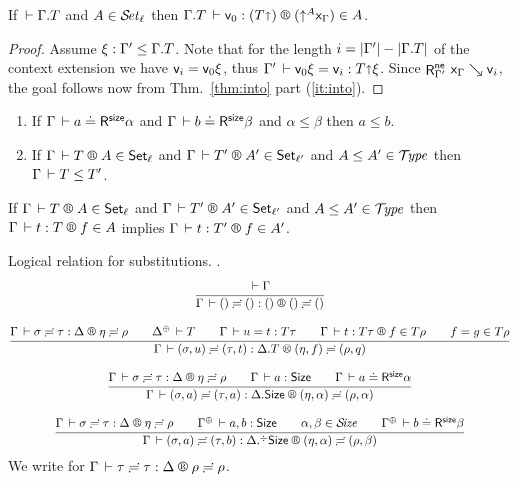 \documentclass[acmlarge,review,anonymous]{acmart}\settopmatter{printfolios=true}
\begin{document}
\begin{corollary}
  \label{cor:fresh}
  If $\der \cext \Gamma T$ and $A \in \SET[\ell]$
  then $\LR {\cext \Gamma T} {\ind 0} {(T \slift)} {(\up A \var\Gamma)} A$.
\end{corollary}
\begin{proof}
  Assume $\xi : \Gamma' \leq \cext \Gamma T$.
  Note that for the length
  $i = |\Gamma'| - |\cext \Gamma T|$ of the context extension
  we have $\ind i = \ind 0 \xi$, thus
  $\Gamma' \der \ind 0 \xi = \ind i : T \slift \xi$.
  Since $\RNe{\Gamma'} {\var\Gamma} {\ind i}$,
  the goal follows now from Thm.~\ref{thm:into} part (\ref{it:into}).
\end{proof}


\begin{lemma}
\label{lem:lrsub}
\bla
\begin{enumerate}
\item
   If $\LRSize \Gamma a \alpha$ and $\LRSize \Gamma {b} \beta$ and $\alpha \leq \beta$ then $a \leq b$.
\item
   If $\LRT \Gamma T A \ell$ and $\LRT \Gamma {T'} {A'} {\ell'}$ and $A \leq A' \in \TYPE$ then $\Gamma \der T \leq T'$.
\end{enumerate}
\end{lemma}


\begin{lemma}
\label{lem:lrsump}
   If $\LRT \Gamma T A \ell$ and $\LRT \Gamma {T'} {A'} {\ell'}$ and $A \leq A' \in \TYPE$ then
   $\LR \Gamma t T f A$ implies $\LR \Gamma t {T'} f {A'}$.
\end{lemma}


Logical relation for substitutions.
\fbox{$\LRSub \Gamma \sigma \tau \Delta \eta \rho$}.
\begin{gather*}
  \ru{\der \Gamma
    }{\LRSub \Gamma {\sempty} {\sempty} {\cempty} {\sempty} {\sempty}}
\\[2ex]
  \ru{\LRSub \Gamma \sigma \tau \Delta \eta \rho \qquad
      \resurrect \Delta \der T \qquad
      \Gamma \der u = t : T\tau \qquad
      \LR \Gamma t {T \tau} f {T \rho} \qquad
      f = g \in T\rho
    }{\LRSub \Gamma {(\sigma,u)} {(\tau,t)} {\cext \Delta T} {(\eta,f)} {(\rho,q)}}
\\[2ex]
  \ru{\LRSub \Gamma \sigma \tau \Delta \eta \rho \qquad
      \Gamma \der a : \Size \qquad
      \LRSize \Gamma a \alpha
    }{\LRSub \Gamma {(\sigma,a)} {(\tau,a)} {\cext \Delta \Size} {(\eta,\alpha)} {(\rho,\alpha)}}
\\[2ex]
  \ru{\LRSub \Gamma \sigma \tau \Delta \eta \rho \qquad
      \resurrect \Gamma \der a, b : \Size \qquad
      \alpha,\beta \in \SIZE \qquad
      \LRSize {\resurrect\Gamma} b \beta
    }{\LRSub \Gamma {(\sigma,a)} {(\tau,b)} {\erext \Delta \Size} {(\eta,\alpha)} {(\rho,\beta)}}
\end{gather*}
We write \fbox{$\LRS \Gamma \tau \Delta \rho$} for $\LRSub \Gamma \tau \tau \Delta \rho \rho$.
\end{document}
